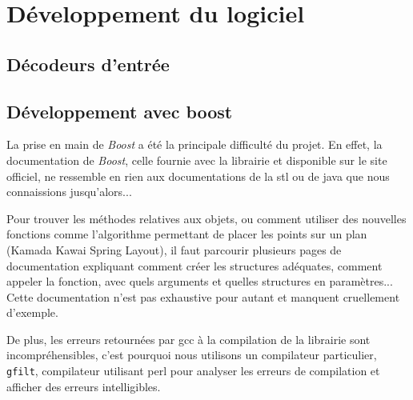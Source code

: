 \section{Développement du logiciel}
\subsection{Décodeurs d'entrée}
\subsection{Développement avec boost}
La prise en main de \textit{Boost} a été la principale difficulté du projet. En effet, la documentation de \textit{Boost}, celle fournie avec la librairie et disponible sur le site officiel, ne ressemble en rien aux documentations de la stl ou de java que nous connaissions jusqu'alors...

Pour trouver les méthodes relatives aux objets, ou comment utiliser des nouvelles fonctions comme l'algorithme permettant de placer les points sur un plan (Kamada Kawai Spring Layout), il faut parcourir plusieurs pages de documentation expliquant comment créer les structures adéquates, comment appeler la fonction, avec quels arguments et quelles structures en paramètres... Cette documentation n'est pas exhaustive pour autant et manquent cruellement d'exemple. 

De plus, les erreurs retournées par gcc à la compilation de la librairie sont incompréhensibles, c'est pourquoi nous utilisons un compilateur particulier, \verb|gfilt|, compilateur utilisant perl pour analyser les erreurs de compilation et afficher des erreurs intelligibles. 




